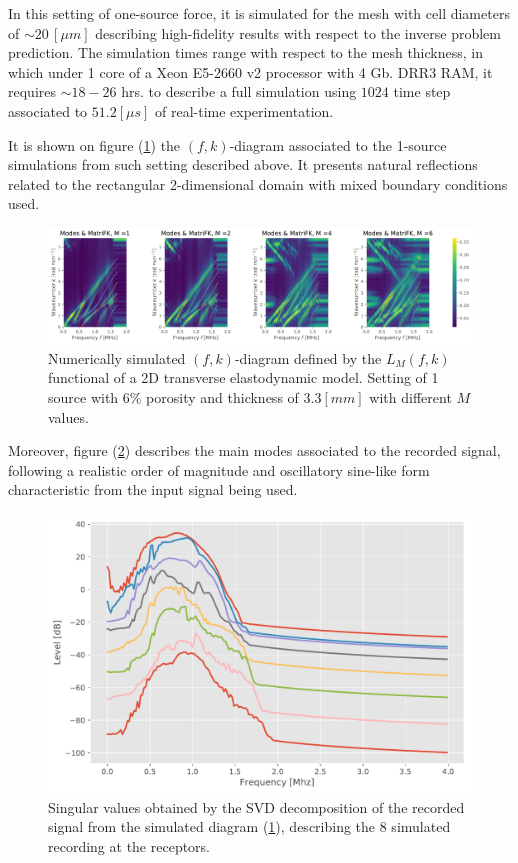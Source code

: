 \begin{rem}
In this setting of one-source force, it is simulated for the mesh with cell diameters of $\sim 20 \, [\mu m]$ describing high-fidelity results with respect to the inverse problem prediction. The simulation times range with respect to the mesh thickness, in which under 1 core of a Xeon E5-2660 v2 processor with 4 Gb. DRR3 RAM, it requires $\sim 18-26$ hrs. to describe a full simulation using $1024$ time step associated to $51.2 [\mu s]$ of real-time experimentation.
\end{rem}
It is shown on figure (\ref{FK-DiagramS1P6M33}) the $(f,k)$-diagram associated to the 1-source simulations from such setting described above. It presents natural reflections related to the rectangular 2-dimensional domain with mixed boundary conditions used.
\begin{figure}[!h]
	\centering
	\includegraphics[width=\textwidth]{images/TimeSingSous/2DTime_P6ElasticFK33M1460_y.pdf}
	\caption{Numerically simulated $(f,k)$-diagram defined by the $L_M(f,k)$ functional of a 2D transverse elastodynamic model. Setting of 1 source with $6\%$ porosity and thickness of $3.3 [mm]$ with different $M$ values.}
	\label{FK-DiagramS1P6M33}
\end{figure}

Moreover, figure (\ref{SVD-S1P6M33}) describes the main modes associated to the recorded signal, following a realistic order of magnitude and oscillatory sine-like form characteristic from the input signal being used.
\begin{figure}[!h]
	\centering
	\includegraphics[scale=.5]{images/TimeSingSous/2DTime_P6Elastic33_SV.pdf}
	\caption{Singular values obtained by the SVD decomposition of the recorded signal from the simulated diagram (\ref{FK-DiagramS1P6M33}), describing the 8 simulated recording at the receptors.}
	\label{SVD-S1P6M33}
\end{figure}

